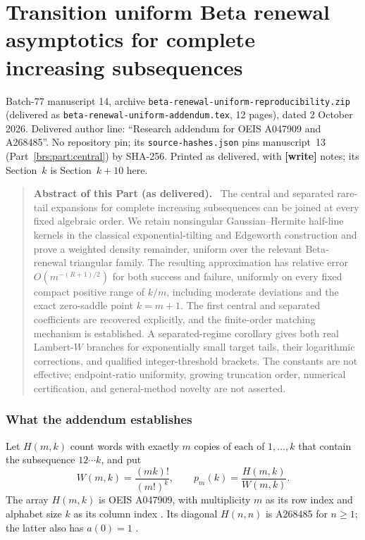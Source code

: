 \documentclass[11pt]{article}
\newcommand{\parthead}{Front matter}
\numberwithin{equation}{section}
\theoremstyle{remark}\newtheorem{remark}[theorem]{Remark}
\newcommand{\file}[1]{\nolinkurl{#1}}
\newenvironment{partabstract}{\begin{quote}\small\noindent\textbf{Abstract of this Part (as delivered).}\ }{\end{quote}}
\newcommand{\partsource}[1]{\par\noindent\begin{minipage}{\textwidth}\small #1\end{minipage}\par\medskip}
\begin{document}
\clearpage
\renewcommand{\parthead}{Part II: transition-uniform accuracy}
\part{Transition uniform Beta renewal asymptotics for complete increasing subsequences}\label{brs:part:uniform}
\partsource{Batch-77 manuscript 14, archive \file{beta-renewal-uniform-reproducibility.zip} (delivered as \file{beta-renewal-uniform-addendum.tex}, 12 pages), dated 2 October 2026. Delivered author line: ``Research addendum for OEIS A047909 and A268485''. No repository pin; its \file{source-hashes.json} pins manuscript~13 (Part~\ref{brs:part:central}) by SHA-256. Printed as delivered, with \textbf{[write]} notes; its Section~$k$ is Section~$k+10$ here.}
\begin{partabstract}
The central and separated rare-tail expansions for complete increasing
subsequences can be joined at every fixed algebraic order.  We retain
nonsingular Gaussian--Hermite half-line kernels in the classical
exponential-tilting and Edgeworth construction and prove a weighted
density remainder, uniform over the relevant Beta-renewal triangular
family.  The resulting approximation has relative error
$O(m^{-(R+1)/2})$ for both success and failure, uniformly on every fixed
compact positive range of $k/m$, including moderate deviations and the
exact zero-saddle point $k=m+1$.  The first central and separated
coefficients are recovered explicitly, and the finite-order matching
mechanism is established.  A separated-regime corollary gives both real
Lambert-$W$ branches for exponentially small target tails, their
logarithmic corrections, and qualified integer-threshold brackets.
The constants are not effective; endpoint-ratio uniformity, growing
truncation order, numerical certification, and general-method novelty
are not asserted.
\end{partabstract}

\section{What the addendum establishes}

Let $H(m,k)$ count words with exactly $m$ copies of each of
$1,\ldots,k$ that contain the subsequence $12\cdots k$, and put
\begin{equation}\label{brs:un:eq:count}
 W(m,k)=\frac{(mk)!}{(m!)^k},\qquad
 p_m(k)=\frac{H(m,k)}{W(m,k)}.
\end{equation}
The array $H(m,k)$ is OEIS A047909, with multiplicity $m$ as its row
index and alphabet size $k$ as its column index \cite{oeisarray}.  Its diagonal
$H(n,n)$ is A268485 for $n\ge1$; the latter also has $a(0)=1$ \cite{oeisdiag}.
\end{document}
